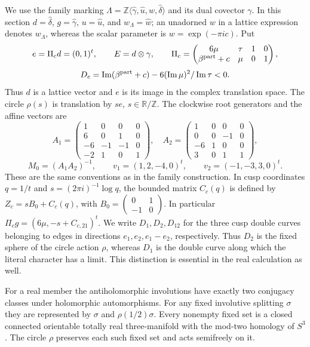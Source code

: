 We use the family marking
$\Lambda=\mathbb Z\langle\widehat\gamma,\widehat u,\widehat w,
\widehat\delta\rangle$ and its dual covector $\gamma$.
In this section $d=\widehat\delta$, $g=\widehat\gamma$,
$u=\widehat u$, and $w_{\Lambda}=\widehat w$; an unadorned $w$ in a
lattice expression denotes $w_{\Lambda}$, whereas the scalar parameter is
$w=\exp(-\pi i c)$. Put
\[
 e=\Pi_c d=(0,1)^t,\qquad E=d\otimes\gamma,
 \qquad \Pi_c=
 \begin{pmatrix}6\mu&\tau&1&0\\\beta^{\rm part}+c&\mu&0&1\end{pmatrix},
\]
\[
 D_c=\operatorname{Im}(\beta^{\rm part}+c)
       -6(\operatorname{Im}\mu)^2/\operatorname{Im}\tau<0.
\]
Thus $d$ is a lattice vector and $e$ is its image in the complex translation
space. The circle $\rho(s)$ is translation by $se$, $s\in\mathbb R/\mathbb Z$.
The clockwise root generators and the affine vectors are
\[
 A_1=\begin{pmatrix}1&0&0&0\\6&0&1&0\\-6&-1&-1&0\\-2&1&0&1\end{pmatrix},\quad
 A_2=\begin{pmatrix}1&0&0&0\\0&0&-1&0\\-6&1&0&0\\3&0&1&1\end{pmatrix},
\]
\[
 M_0=(A_1A_2)^{-1},\qquad
 v_1=(1,2,-4,0)^t,\qquad v_2=(-1,-3,3,0)^t.
\]
These are the same conventions as in the family construction. In cusp
coordinates $q=1/t$ and $s=(2\pi i)^{-1}\log q$, the bounded matrix $C_c(q)$
is defined by $Z_c=sB_0+C_c(q)$, with
$B_0=\left(\begin{smallmatrix}0&1\\-1&0\end{smallmatrix}\right)$.
In particular $\Pi_cg=(6\mu,-s+C_{c,21})^t$.
We write $D_1,D_2,D_{12}$ for the three cusp double curves belonging to
edges in directions $e_1,e_2,e_1-e_2$, respectively. Thus $D_2$ is the
fixed sphere of the circle action $\rho$, whereas $D_1$ is the double
curve along which the literal character has a limit. This distinction
is essential in the real calculation as well.

\begin{proposition}\label{mapsI:src:A.3.1}
For a real member the antiholomorphic involutions have exactly two
conjugacy classes under holomorphic automorphisms. For any fixed
involutive splitting $\sigma$ they are represented by $\sigma$ and
$\rho(1/2)\sigma$. Every nonempty fixed set is a closed connected
orientable totally real three-manifold with the mod-two homology of
$S^3$. The circle $\rho$ preserves each such fixed set and acts
semifreely on it.
\end{proposition}



